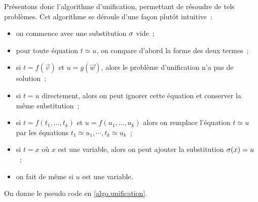 Présentons donc l'algorithme d'unification, permettant de résoudre
de tels problèmes. Cet algorithme se déroule d'une façon
plutôt intuitive~:
\begin{itemize}
\item on commence avec une substitution $\sigma$ vide~;
\item pour toute équation $t\simeq u$, on compare d'abord la forme
  des deux termes~;
\item si $t = f(\vec v)$ et $u = g(\vec w)$, alors le problème
  d'unification n'a pas de solution~;
\item si $t = u$ directement, alors on peut ignorer cette équation
  et conserver la même substitution~;
\item si $t = f(t_1,\ldots, t_k)$ et $u = f(u_1,\ldots,u_k)$ alors
  on remplace l'équation $t \simeq u$ par les équations
  $t_1 \simeq u_1,\cdots, t_k \simeq u_k$~;
\item si $t = x$ où $x$ est une variable, alors on peut ajouter
  la substitution $\sigma(x) = u$~;
\item on fait de même si $u$ est une variable.
\end{itemize}
On donne le pseudo code en \cref{algo.unification}.

\begin{algorithm}[t]
  \caption{Algorithme d'unification de Robinson}
  \label{algo.unification}
\end{algorithm}

